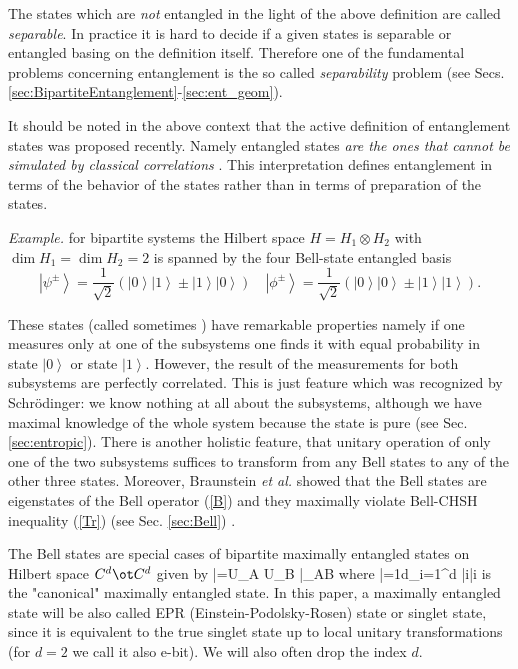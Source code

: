 \documentclass[twocolumn,aps,rmp]{revtex4}
\begin{document}
The states which are {\it not} entangled in the light of the above
definition are called {\it separable}. In practice it is hard to
decide if a given states is separable or entangled basing on the
definition itself. Therefore one of the fundamental problems
concerning entanglement is the so called {\it separability} problem
(see Secs. \ref{sec:BipartiteEntanglement}-\ref{sec:ent_geom}).

It should be noted in the above context that the active definition of entanglement states was proposed recently.  Namely entangled states
{\it are the ones that cannot be simulated by classical correlations}
\cite{MasanesLD2007}.
This interpretation defines entanglement in terms of the behavior of the states rather than in terms of preparation of the states.

{\it Example. }for bipartite systems the Hilbert space
$\textit{H}=\textit{H}_1 \otimes\textit{H}_2$ with $\dim H_1=\dim
H_2=2$ is spanned by the four Bell-state entangled basis
\begin{equation}
\left|\psi^\pm\right\rangle=\frac{1}{\sqrt{2}}(\left|0\right\rangle \left|1\right\rangle\pm \left|1\right\rangle \left|0\right\rangle) \quad
\left|\phi^\pm\right\rangle=\frac{1}{\sqrt{2}}(\left|0\right\rangle \left|0\right\rangle\pm \left|1\right\rangle \left|1\right\rangle).
\label{basis}
\end{equation}

These states (called sometimes \eprstates) have remarkable properties
namely if one measures only at one of the subsystems one finds it with
equal probability in state $\left|0\right\rangle$ or state
$\left|1\right\rangle$.  However, the result of the measurements for
both subsystems are perfectly correlated. This is just feature which
was recognized by Schr{\"o}dinger: we know nothing at all about the
subsystems, although we have maximal knowledge of the whole system
because the state is pure (see Sec. \ref{sec:entropic}).  There is
another holistic feature, that unitary operation of only one of the
two subsystems suffices to transform from any Bell states to any of
the other three states. Moreover, Braunstein \emph{et al.}  showed
that the Bell states are eigenstates of the Bell operator (\ref{B})
and they maximally violate Bell-CHSH inequality (\ref{Tr}) (see
Sec. \ref{sec:Bell}) \cite {Braunstein2}.

The Bell states are special cases of bipartite maximally entangled
states on Hilbert space $C^d\ot C^d$ given by
\be
|\psi\>=U_A \ot U_B |\Phiplusd\>_{AB}
\ee
where
\be
|\Phiplusd\>={1\over \sqrt d}\sum_{i=1}^d |i\>|i\>
\ee
is the "canonical" maximally entangled state.
In this paper, a maximally entangled state will be  also
called EPR (Einstein-Podolsky-Rosen) state or singlet state, since it is equivalent to the true singlet state up to local unitary transformations (for $d = 2$ we call it also e-bit). We will also often drop the index $d$.
\end{document}
